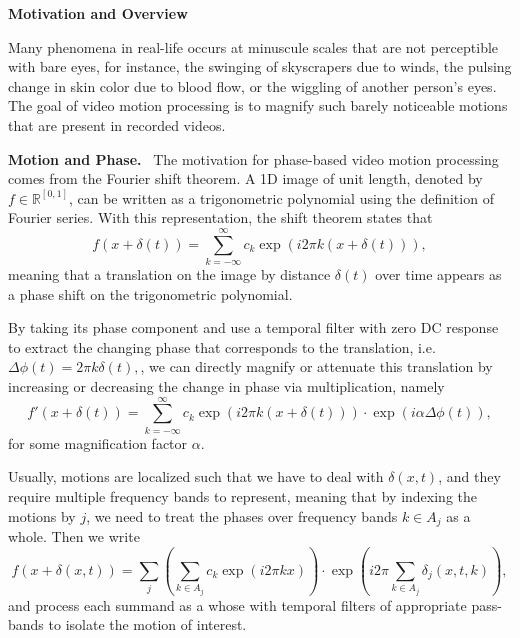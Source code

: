 \documentclass[aspectratio=43]{beamer}
\begin{document}
\begin{frame}[t]
\vspace{0.5em}

\setlength{\columnsep}{0.8in}
\begin{multicols}{2}
\justify

\centerline{\large\textbf{Motivation and Overview}}

Many phenomena in real-life occurs at minuscule scales that are not perceptible with bare eyes, for instance, the swinging of skyscrapers due to winds, the pulsing change in skin color due to blood flow, or the wiggling of another person's eyes.  The goal of video motion processing is to magnify such barely noticeable motions that are present in recorded videos.

\textbf{Motion and Phase.} \ The motivation for phase-based video motion processing comes from the Fourier shift theorem.  A 1D image of unit length, denoted by $f\in\mathbb{R}^{[0,1]}$, can be written as a trigonometric polynomial using the definition of Fourier series.  With this representation, the shift theorem states that 
\begin{equation}
  f(x+\delta(t)) = \sum_{k=-\infty}^\infty c_k \exp\left(i2\pi k(x+\delta(t))\right),
\end{equation}
meaning that a translation on the image by distance $\delta(t)$ over time appears as a phase shift on the trigonometric polynomial.

By taking its phase component and use a temporal filter with zero DC response to extract the changing phase that corresponds to the translation, i.e. $\Delta\phi(t)=2\pi k \delta(t),$, we can directly magnify or attenuate this translation by increasing or decreasing the change in phase via multiplication, namely 
\begin{equation}
  f'(x+\delta(t)) = \sum_{k=-\infty}^\infty c_k \exp\left(i2\pi k(x+\delta(t))\right)\cdot \exp\left(i\alpha\Delta\phi(t)\right),
\end{equation}
for some magnification factor $\alpha$.

Usually, motions are localized such that we have to deal with $\delta(x,t)$, and they require multiple frequency bands to represent, meaning that by indexing the motions by $j$, we need to treat the phases over frequency bands $k\in A_j$ as a whole.  Then we write
\begin{equation}
  f(x+\delta(x,t)) = \sum_{j} \left(\sum_{k\in A_j} c_k \exp\left(i2\pi kx\right) \right) \cdot \exp
\left(i2\pi \sum_{k\in A_j}\delta_j(x,t,k)\right),
\end{equation}
and process each summand as a whose with temporal filters of appropriate pass-bands to isolate the motion of interest.



\end{multicols}
\end{frame}
\end{document}
